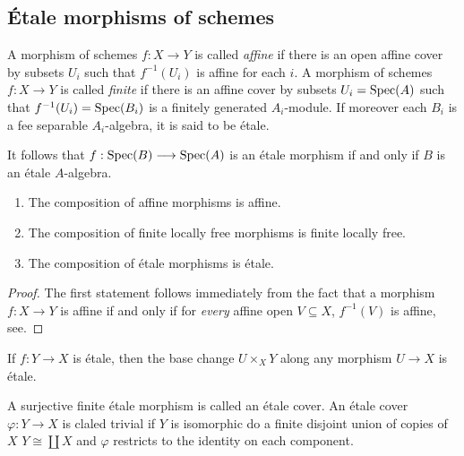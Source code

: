 \subsection{\'Etale morphisms of schemes}
\begin{definition}
A morphism of schemes $f: X \to Y$ is called \textit{affine} if there is an open affine cover by subsets $U_i$ such that $f^{-1}(U_i)$ is affine for each $i$.  A morphism of schemes $f: X \to Y$ is called \textit{finite} if there is an affine cover by subsets $U_i = \operatorname{Spec}(A)$ such that $f^{-1}(U_i) = \operatorname{Spec}(B_i)$ is a finitely generated $A_i$-module.  If moreover each $B_i$ is a fee separable $A_i$-algebra, it is said to be \'etale.
\end{definition}
It follows that $f: \operatorname{Spec}(B) \longrightarrow \operatorname{Spec}(A)$ is an \'etale morphism if and only if $B$ is an \'etale $A$-algebra.

\begin{lemma}
  \begin{enumerate}
    \item The composition of affine morphisms is affine.
    \item The composition of finite locally free morphisms is finite locally free.
    \item The composition of \'etale morphisms is \'etale.
  \end{enumerate}
\end{lemma}
\begin{proof}
  The first statement follows immediately from the fact that a morphism $f: X \to Y$ is affine if and only if for \textit{every} affine open $V \subseteq X$, $f^{-1}(V)$ is affine, see\cite{Hartshorne}.
\end{proof}


\begin{lemma}
  If $f: Y \to X$ is \'etale, then the base change $U \times_X Y$ along any morphism $U \to X$ is \'etale.
\end{lemma}
\begin{definition}
  A surjective finite \'etale morphism is called an \'etale cover. An \'etale cover $\varphi : Y \to X$ is claled trivial if $Y$ is isomorphic do a finite disjoint union of copies of $X$ $Y \cong \coprod X$ and $\varphi$ restricts to the identity on each component.
\end{definition}

